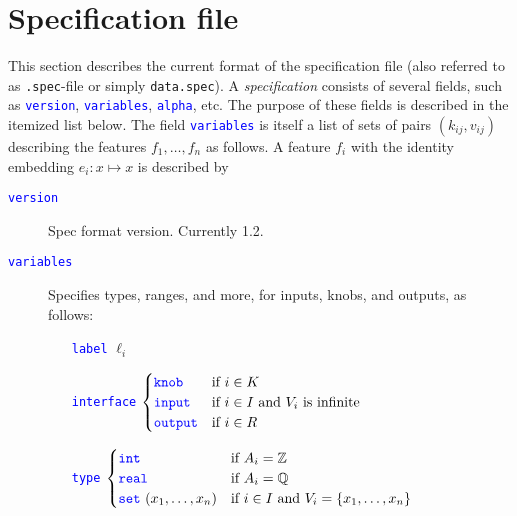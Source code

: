 \documentclass[a4paper,parskip=half]{article} %
\newcommand*\spec[1]{\textcolor{blue}{\texttt{#1}}}
\begin{document}
\section{Specification file}


This section describes the current format of the specification file
(also referred to as \texttt{.spec}-file or simply \texttt{data.spec}).
A \emph{specification} consists of several fields, such as \spec{version}, \spec{variables}, \spec{alpha}, etc. 
The purpose of these fields is described in the itemized list below. The field \spec{variables} is itself  a list of sets of 
pairs $(k_{ij},v_{ij})$ describing the features $f_1,\ldots,f_n$ as follows.
%
A feature $f_i$ with the identity embedding $e_i:x\mapsto x$ is described by
\begin{description}
\item[\spec{version}] Spec format version. Currently 1.2.
\item[\spec{variables}] Specifies types, ranges, and more, for inputs, knobs, and outputs, as follows:
\begin{itemize}%
\item[\spec{label}] $\ell_i$
\item[\spec{interface}]
	$\begin{cases}
		\spec{knob}     & \text{if}~i\in K \\
		\spec{input}    & \text{if}~i\in I~\text{and}~V_i~\text{is infinite} \\
		\spec{output} & \text{if}~i\in R
	\end{cases}$

\item[\spec{type}]
	$\begin{cases}
		\spec{int}  &\text{if}~A_i=\mathbb Z \\
		\spec{real}  &\text{if}~A_i=\mathbb Q \\
		\spec{set} \,\, (x_1,\ldots,x_n) & \text{if}~i\in I~\text{and}~V_i=\{x_1,\ldots,x_n\}
	\end{cases}$


\end{itemize}
\end{description}
\end{document}
